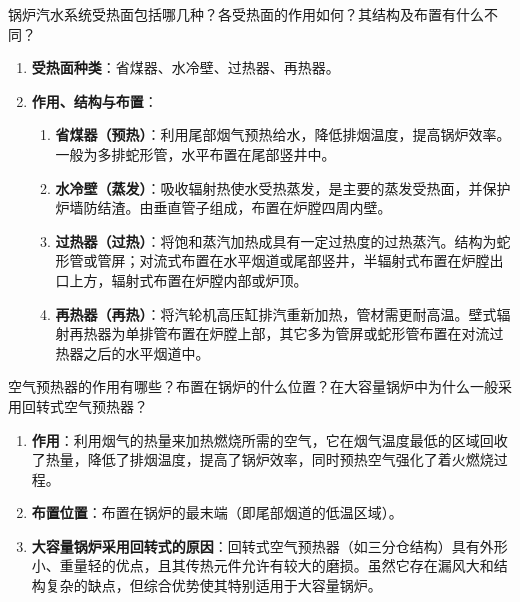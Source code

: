 \begin{problem}
锅炉汽水系统受热面包括哪几种？各受热面的作用如何？其结构及布置有什么不同？
\end{problem}

\begin{solution}
\begin{enumerate}
  \item \textbf{受热面种类}：省煤器、水冷壁、过热器、再热器。
  \item \textbf{作用、结构与布置}：
  \begin{enumerate}
    \item \textbf{省煤器（预热）}：利用尾部烟气预热给水，降低排烟温度，提高锅炉效率。一般为多排蛇形管，水平布置在尾部竖井中。
    \item \textbf{水冷壁（蒸发）}：吸收辐射热使水受热蒸发，是主要的蒸发受热面，并保护炉墙防结渣。由垂直管子组成，布置在炉膛四周内壁。
    \item \textbf{过热器（过热）}：将饱和蒸汽加热成具有一定过热度的过热蒸汽。结构为蛇形管或管屏；对流式布置在水平烟道或尾部竖井，半辐射式布置在炉膛出口上方，辐射式布置在炉膛内部或炉顶。
    \item \textbf{再热器（再热）}：将汽轮机高压缸排汽重新加热，管材需更耐高温。壁式辐射再热器为单排管布置在炉膛上部，其它多为管屏或蛇形管布置在对流过热器之后的水平烟道中。
  \end{enumerate}
\end{enumerate}
\end{solution}

\begin{problem}
空气预热器的作用有哪些？布置在锅炉的什么位置？在大容量锅炉中为什么一般采用回转式空气预热器？
\end{problem}

\begin{solution}
\begin{enumerate}
  \item \textbf{作用}：利用烟气的热量来加热燃烧所需的空气，它在烟气温度最低的区域回收了热量，降低了排烟温度，提高了锅炉效率，同时预热空气强化了着火燃烧过程。
  \item \textbf{布置位置}：布置在锅炉的最末端（即尾部烟道的低温区域）。
  \item \textbf{大容量锅炉采用回转式的原因}：回转式空气预热器（如三分仓结构）具有外形小、重量轻的优点，且其传热元件允许有较大的磨损。虽然它存在漏风大和结构复杂的缺点，但综合优势使其特别适用于大容量锅炉。
\end{enumerate}
\end{solution}
